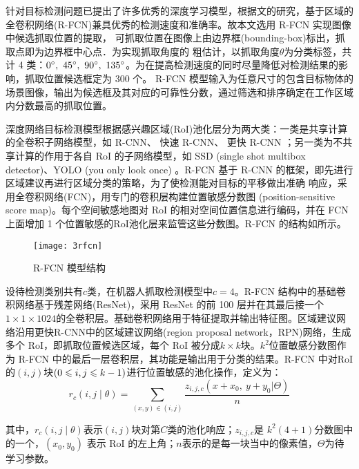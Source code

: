 \documentclass{hitszthesis}
\begin{document}
针对目标检测问题已提出了许多优秀的深度学习模型，根据文的研究，基于区域的全卷积网络(R-FCN)兼具优秀的检测速度和准确率。故本文选用 R-FCN 实现图像中候选抓取位置的提取， 可抓取位置在图像上由边界框(bounding-box)标出，抓取点即为边界框中心点．为实现抓取角度的 粗估计，以抓取角度$\theta$为分类标签，共计 4 类：$0\degree,\ 45\degree,\ 90\degree,\ 135\degree$。为在提高检测速度的同时尽量降低对检测结果的影响，抓取位置候选框定为 300 个。 R-FCN 模型输入为任意尺寸的包含目标物体的场景图像，输出为候选框及其对应的可靠性分数，通过筛选和排序确定在工作区域内分数最高的抓取位置。

深度网络目标检测模型根据感兴趣区域(RoI)池化层分为两大类：一类是共享计算的全卷积子网络模型，如 R-CNN、 快速 R-CNN、 更快 R-CNN ；另一类为不共享计算的作用于各自 RoI 的子网络模型，如 SSD (single shot multibox detector)、YOLO (you only look once) 。R-FCN 基于 R-CNN 的框架，即先进行区域建议再进行区域分类的策略，为了使检测能对目标的平移做出准确 响应，采用全卷积网络(FCN)，用专门的卷积层构建位置敏感分数图 (position-sensitive score map)。每个空间敏感地图对 RoI 的相对空间位置信息进行编码，并在 FCN 上面增加 1 个位置敏感的RoI池化层来监管这些分数图。R-FCN 的结构如所示。

\begin{figure}[!htbp]
	\centering
	\texttt{[image: 3rfcn]}
	\caption{R-FCN 模型结构}
     \label{figrfcn}
\end{figure}

设待检测类别共有$c$类，在机器人抓取检测模型中$c = 4$。R-FCN 结构中的基础卷积网络基于残差网络(ResNet)，采用 ResNet 的前 100 层并在其最后接一个$1\times1\times1024$的全卷积层。基础卷积网络用于特征提取并输出特征图。区域建议网络沿用更快R-CNN中的区域建议网络(region proposal network，RPN)网络，生成多个 RoI，即抓取位置候选区域，每个 RoI 被分成$k\times k$块。$k^2$位置敏感分数图作为 R-FCN 中的最后一层卷积层，其功能是输出用于分类的结果。R-FCN 中对RoI 的$(i, j)$块$(0\leqslant i, j\leqslant k-1)$进行位置敏感的池化操作，定义为：
\begin{equation}
r_c(i,j\mid\theta)=\sum_{(x,y)\in(i,j)}\frac{z_{i,j,c}(x+x_0,\ y+y_0|\Theta)}{n}
\label{eqrcijt}
\end{equation}

其中，$r_c(i,j\mid\theta)$表示$ (i, j) $块对第$ C $类的池化响应；$z_{i,j,c}$是 $k^2(4 + 1)$分数图中的一个，$(x_0, y_0)$ 表示 RoI 的左上角；$n$表示的是每一块当中的像素值，$\Theta$为待学习参数。
\end{document}
